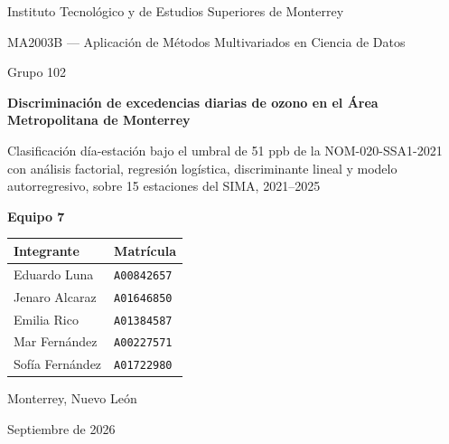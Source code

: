 \documentclass[5p,nonatbib]{elsarticle}
\begin{document}
\begin{titlepage}
  \centering
  \vspace*{2cm}
  {\large Instituto Tecnológico y de Estudios Superiores de Monterrey\par}
  \vspace{0.4cm}
  {\large MA2003B --- Aplicación de Métodos Multivariados en Ciencia de Datos\par}
  {\large Grupo 102\par}
  \vspace{2.5cm}
  {\LARGE\bfseries Discriminación de excedencias diarias de ozono en el Área
    Metropolitana de Monterrey\par}
  \vspace{0.6cm}
  {\large Clasificación día-estación bajo el umbral de 51 ppb de la
    NOM-020-SSA1-2021 con análisis factorial, regresión logística,
    discriminante lineal y modelo autorregresivo, sobre 15 estaciones del
    SIMA, 2021--2025\par}
  \vspace{2.5cm}
  {\large\bfseries Equipo 7\par}
  \vspace{0.5cm}
  \begin{tabular}{ll}
    \toprule
    Integrante & Matrícula \\
    \midrule
    Eduardo Luna    & \texttt{A00842657} \\
    Jenaro Alcaraz  & \texttt{A01646850} \\
    Emilia Rico     & \texttt{A01384587} \\
    Mar Fernández   & \texttt{A00227571} \\
    Sofía Fernández & \texttt{A01722980} \\
    \bottomrule
  \end{tabular}
  \vfill
  {\large Monterrey, Nuevo León\par}
  {\large Septiembre de 2026\par}
\end{titlepage}
\end{document}
